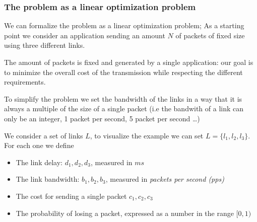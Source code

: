 \documentclass{report}
\begin{document}


\subsubsection{The problem as a linear optimization problem}

We can formalize the problem as a linear optimization problem;
As a starting point we consider an application sending an amount $N$ of packets of fixed size using three different links.

The amount of packets is fixed and generated by a single application: our goal is to minimize the overall cost of the transmission while respecting the different requirements.

To simplify the problem we set the bandwidth of the links in a way that it is always a multiple of the size of a single packet (i.e the bandwith of a link can only be an integer, 1 packet per second, 5 packet per second \dots)


We consider a set of links $L$, to visualize the example we can set  $L = \{l_1, l_2, l_3 \}$. \\

For each one we define
\begin{itemize}
	\item The link delay:  $d_1, d_2, d_3$, measured in $ms$
	\item The link bandwidth: $b_1, b_2, b_3$, measured in \textit{packets per second (pps)}
	\item The cost for sending a single packet $c_1, c_2, c_3$
	\item The probability of losing a packet, expressed as a number in the range $ [0, 1)$
\end{itemize}
\end{document}
